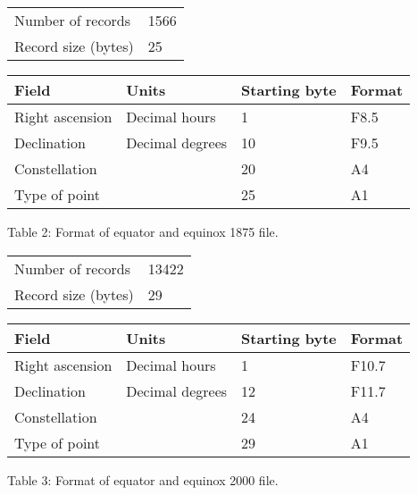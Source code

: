 \begin{table}

\begin{tabular}{|l|l|}\hline
Number of records           &  1566  \\
Record size (bytes)         &  25    \\ \hline
\end{tabular}

\begin{tabular}{|l|l|l|l|}\hline
Field           & Units           & Starting byte &  Format  \\ \hline
Right ascension & Decimal hours   & 1             &  F8.5    \\
Declination     & Decimal degrees & 10            &  F9.5    \\
Constellation   &                 & 20            &  A4      \\
Type of point   &                 & 25            &  A1      \\ \hline
\end{tabular}

\begin{center}
Table 2: Format of equator and equinox 1875 file.
\end{center}

\end{table}


%
%

\begin{table}

\begin{tabular}{|l|l|}\hline
Number of records                &  13422  \\
Record size (bytes)              &  29     \\ \hline
\end{tabular}

\begin{tabular}{|l|l|l|l|}\hline
Field           & Units           & Starting byte &  Format  \\ \hline
Right ascension & Decimal hours   & 1             &  F10.7   \\
Declination     & Decimal degrees & 12            &  F11.7   \\
Constellation   &                 & 24            &  A4      \\
Type of point   &                 & 29            &  A1      \\ \hline
\end{tabular}

\begin{center}
Table 3: Format of equator and equinox 2000 file.
\end{center}

\end{table}


